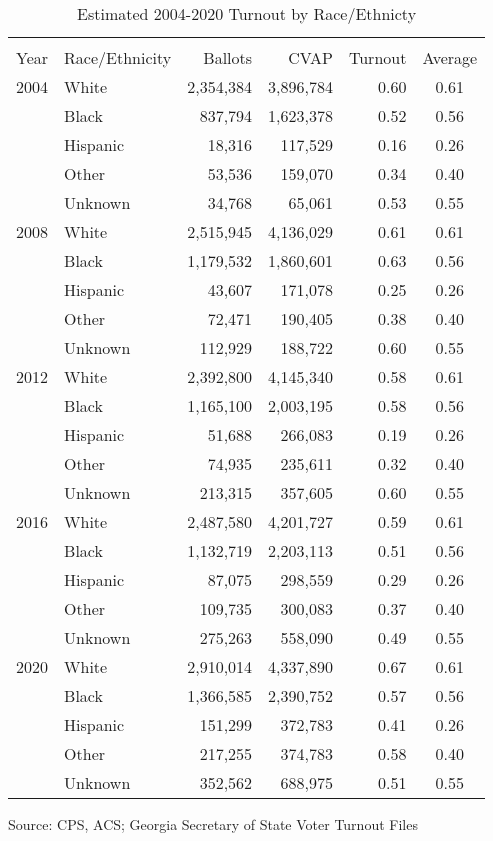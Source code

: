


\begin{table}[H]
\centering
\begin{threeparttable}
\caption{Estimated 2004-2020 Turnout by Race/Ethnicty}  
\label{tab:cvap-to}
\begin{tabular}{rlrrrc}
  \hline \\ \vspace{0.5em} 
Year & Race/Ethnicity & Ballots & CVAP & Turnout &  Average \vspace{0.5em}  \\ 
  \hline  
2004 & White & 2,354,384 & 3,896,784 & 0.60 & 0.61 \\ 
   & Black & 837,794 & 1,623,378 & 0.52 & 0.56 \\ 
   & Hispanic & 18,316 & 117,529 & 0.16 & 0.26 \\ 
   & Other & 53,536 & 159,070 & 0.34 & 0.40 \\ 
   & Unknown & 34,768 & 65,061 & 0.53 & 0.55 \\ 
  2008 & White & 2,515,945 & 4,136,029 & 0.61 & 0.61 \\ 
   & Black & 1,179,532 & 1,860,601 & 0.63 & 0.56 \\ 
   & Hispanic & 43,607 & 171,078 & 0.25 & 0.26 \\ 
   & Other & 72,471 & 190,405 & 0.38 & 0.40 \\ 
   & Unknown & 112,929 & 188,722 & 0.60 & 0.55 \\ 
  2012 & White & 2,392,800 & 4,145,340 & 0.58 & 0.61 \\ 
   & Black & 1,165,100 & 2,003,195 & 0.58 & 0.56 \\ 
   & Hispanic & 51,688 & 266,083 & 0.19 & 0.26 \\ 
   & Other & 74,935 & 235,611 & 0.32 & 0.40 \\ 
   & Unknown & 213,315 & 357,605 & 0.60 & 0.55 \\ 
  2016 & White & 2,487,580 & 4,201,727 & 0.59 & 0.61 \\ 
   & Black & 1,132,719 & 2,203,113 & 0.51 & 0.56 \\ 
   & Hispanic & 87,075 & 298,559 & 0.29 & 0.26 \\ 
   & Other & 109,735 & 300,083 & 0.37 & 0.40 \\ 
   & Unknown & 275,263 & 558,090 & 0.49 & 0.55 \\ 
  2020 & White & 2,910,014 & 4,337,890 & 0.67 & 0.61 \\ 
   & Black & 1,366,585 & 2,390,752 & 0.57 & 0.56 \\ 
   & Hispanic & 151,299 & 372,783 & 0.41 & 0.26 \\ 
   & Other & 217,255 & 374,783 & 0.58 & 0.40 \\ 
   & Unknown & 352,562 & 688,975 & 0.51 & 0.55\vspace{0.5em}  \\ 
   \hline
\end{tabular}
{\footnotesize Source: CPS, ACS; Georgia Secretary of State Voter Turnout Files}


\end{threeparttable}
\end{table}
